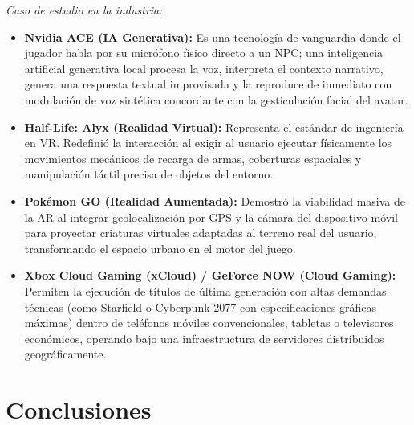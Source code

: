 \documentclass[12pt]{report}
\begin{document}
\textit{Caso de estudio en la industria:}
\begin{itemize}
    \item \textbf{Nvidia ACE (IA Generativa):} Es una tecnología de vanguardia donde el jugador habla por su micrófono físico directo a un NPC; una inteligencia artificial generativa local procesa la voz, interpreta el contexto narrativo, genera una respuesta textual improvisada y la reproduce de inmediato con modulación de voz sintética concordante con la gesticulación facial del avatar.
    \item \textbf{Half-Life: Alyx (Realidad Virtual):} Representa el estándar de ingeniería en VR. Redefinió la interacción al exigir al usuario ejecutar físicamente los movimientos mecánicos de recarga de armas, coberturas espaciales y manipulación táctil precisa de objetos del entorno.
    \item \textbf{Pokémon GO (Realidad Aumentada):} Demostró la viabilidad masiva de la AR al integrar geolocalización por GPS y la cámara del dispositivo móvil para proyectar criaturas virtuales adaptadas al terreno real del usuario, transformando el espacio urbano en el motor del juego.
    \item \textbf{Xbox Cloud Gaming (xCloud) / GeForce NOW (Cloud Gaming):} Permiten la ejecución de títulos de última generación con altas demandas técnicas (como Starfield o Cyberpunk 2077 con especificaciones gráficas máximas) dentro de teléfonos móviles convencionales, tabletas o televisores económicos, operando bajo una infraestructura de servidores distribuidos geográficamente.
\end{itemize}

\chapter*{Conclusiones}
\end{document}
